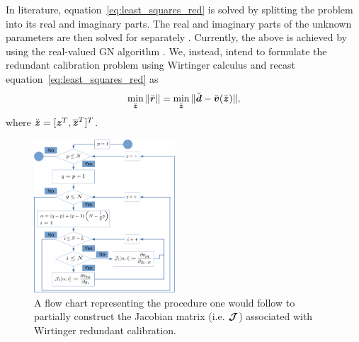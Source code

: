 \documentclass[useAMS,usenatbib]{mn2e}
\newcommand{\bz}{\bmath{z}}
\newcommand{\br}{\bmath{r}}
\newcommand{\bd}{\bmath{d}}
\newcommand{\bv}{\bmath{v}}
\newcommand{\bmJ}{\bmath{\mathcal{J}}}
\newcommand{\conj}[1]{\overline{#1}}
\begin{document}
In literature, equation~\ref{eq:least_squares_red} is solved by splitting the problem into its real and imaginary parts. The real and imaginary parts of the unknown parameters are then solved for separately \citep{Wieringa1992,Liu2010,Zheng2014}. 
Currently, the above is achieved by using the real-valued GN algorithm \citep{Kurien2016}. 
We, instead, intend to formulate the redundant calibration problem using Wirtinger calculus and recast equation~\ref{eq:least_squares_red} as
\begin{equation}
\label{eq:least_squares_complex}
\min_{\breve{\bz}} \|\breve{\br}\| = \min_{\breve{\bz}} \|\breve{\bd} - \breve{\bv}(\breve{\bz})\|, 
\end{equation}
where $\breve{\bz} = [\bz^T,\conj{\bz}^T]^T$. 

\begin{figure}
\includegraphics[width=0.47\textwidth]{./flow_diagram.pdf}
\caption{A flow chart representing the procedure one would follow to partially construct the Jacobian matrix (i.e. $\bmJ$) associated with Wirtinger redundant calibration. \label{fig:flow_chart}}
\end{figure}
\end{document}
